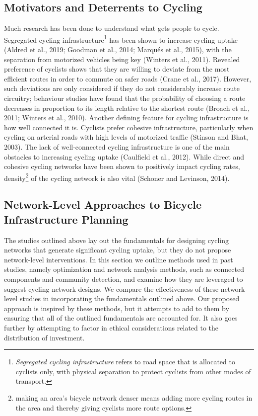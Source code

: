 \documentclass[
]{article}
\begin{document}
\hypertarget{motivators-and-deterrents-to-cycling}{%
\subsection{Motivators and Deterrents to Cycling}\label{motivators-and-deterrents-to-cycling}}

Much research has been done to understand what gets people to cycle.
Segregated cycling infrastructure\footnote{\emph{Segregated cycling infrastructure}
  refers to road space that is allocated to cyclists only, with physical
  separation to protect cyclists from other modes of transport.} has been
shown to increase cycling uptake (Aldred et al., 2019; Goodman et al., 2014; Marqués et al., 2015), with the separation from motorized
vehicles being key (Winters et al., 2011). Revealed preference of
cyclists shows that they are willing to deviate from the most efficient
routes in order to commute on safer roads (Crane et al., 2017).
However, such deviations are only considered if they do not considerably
increase route circuitry; behaviour studies have found that the
probability of choosing a route decreases in proportion to its length
relative to the shortest route (Broach et al., 2011; Winters et al., 2010).
Another defining feature for cycling infrastructure is how well
connected it is. Cyclists prefer cohesive infrastructure, particularly
when cycling on arterial roads with high levels of motorized traffic
(Stinson and Bhat, 2003). The lack of well-connected cycling
infrastructure is one of the main obstacles to increasing cycling uptake
(Caulfield et al., 2012). While direct and cohesive cycling networks
have been shown to positively impact cycling rates, density\footnote{making an
  area's bicycle network denser means adding more cycling routes in the
  area and thereby giving cyclists more route options.} of the cycling
network is also vital (Schoner and Levinson, 2014).

\hypertarget{network-level-approaches-to-bicycle-infrastructure-planning}{%
\subsection{Network-Level Approaches to Bicycle Infrastructure Planning}\label{network-level-approaches-to-bicycle-infrastructure-planning}}

The studies outlined above lay out the fundamentals for designing
cycling networks that generate significant cycling uptake, but they do
not propose network-level interventions. In this section we outline
methods used in past studies, namely optimization and network
analysis methods, such as connected components and community
detection, and examine how they are leveraged to suggest cycling network
designs. We compare the effectiveness of these network-level studies in
incorporating the fundamentals outlined above.
Our proposed approach is inspired by these methods, but it attempts to add to them
by ensuring that all of the outlined fundamentals are accounted for. It
also goes further by attempting to factor in ethical considerations
related to the distribution of investment.
\end{document}
